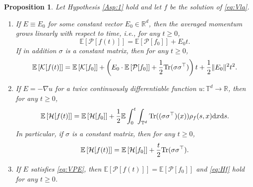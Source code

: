 \documentclass[11pt,reqno]{amsproc}
\newtheorem{proposition}[Def]{Proposition}
\newcommand{\ud}{\mathrm d}
\newcommand{\R}{\mathbb{R}}
\numberwithin{equation}{section}
\newcommand{\E}{\mathbb{E}}\allowdisplaybreaks[4]
\begin{document}
\begin{proposition}\label{tho:Hft}
Let Hypothesis \ref{Asp:1} hold and let $f$ be the solution of \eqref{eq:Vla}.
\begin{enumerate}
\item[(i)]If $E\equiv E_0$ for some constant vector $E_0\in\R^d$, then the averaged momentum grows linearly with respect to time, i.e., for any $t\ge0$,
\begin{equation}\label{eq:momentum}
\E\left[\mathcal{P}[f(t)]\right]=\E\left[\mathcal{P}[f_0]\right]+E_0t.
\end{equation}
If in addition $\sigma$ is a constant matrix, then for any $t\ge0$,
\begin{equation}\label{eq:Kenergy}
\E\left[\mathcal{K}[f(t)]\right]=\E\left[\mathcal{K}[f_0]\right]+\left(E_0\cdot\E\left[\mathcal{P}[f_0]\right]+\frac{1}{2}\textup{Tr}(\sigma\sigma^\top)\right)t+\frac12\|E_0\|^2t^2.
\end{equation}


 \item[(ii)]
If $E=-\nabla u$ for a twice continuously differentiable function $u:\mathbb{T}^d\to\R$, then for any $t\ge0$,
\begin{equation}\label{eq:Hf}
\E\left[\mathcal H[f(t)]\right]=\E\left[\mathcal H[f_0]\right]+\frac12\E\int_0^t\int_{\mathbb{T}^d}\textup{Tr}((\sigma\sigma^\top)(x))
\rho_f(s,x)\ud x\ud s.
\end{equation}
In particular, if $\sigma$ is a constant matrix, then for any $t\ge0$,
\begin{equation}\label{eq:Hftadd}
\E\left[\mathcal H[f(t)]\right]=\E\left[\mathcal H[f_0]\right]+\frac{t}{2}\textup{Tr}(\sigma\sigma^\top).
\end{equation}
\item[(iii)] If $E$ satisfies \eqref{eq:VPE}, then $
\E[\mathcal{P}[f(t)]]=\E[\mathcal{P}[f_0]]
$ and
\eqref{eq:Hf} hold for any $t\ge0$.
\end{enumerate}
\end{proposition}
\end{document}
